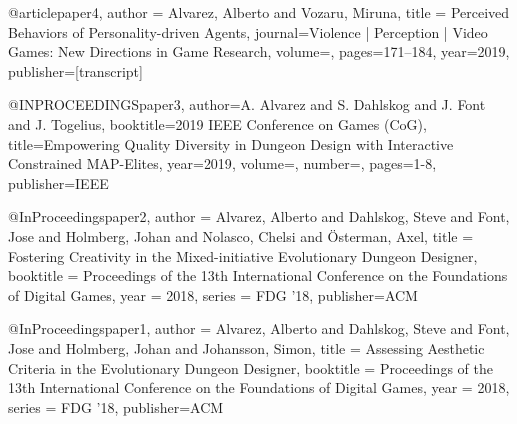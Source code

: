 @article{paper4,
  author    = {Alvarez, Alberto and Vozaru, Miruna},
  title     = {Perceived Behaviors of Personality-driven Agents},
  journal={Violence | Perception | Video Games: New Directions in Game Research},
  volume={},
  pages={171--184},
  year={2019},
  publisher={[transcript]}
}

@INPROCEEDINGS{paper3,
author={A. {Alvarez} and S. {Dahlskog} and J. {Font} and J. {Togelius}},
booktitle={2019 IEEE Conference on Games (CoG)},
title={Empowering Quality Diversity in Dungeon Design with Interactive Constrained MAP-Elites},
year={2019},
volume={},
number={},
pages={1-8},
publisher={IEEE}
}

@InProceedings{paper2,
  author    = {Alvarez, Alberto and Dahlskog, Steve and Font, Jose and Holmberg, Johan and Nolasco, Chelsi and \"{O}sterman, Axel},
  title     = {Fostering Creativity in the Mixed-initiative Evolutionary Dungeon Designer},
  booktitle = {Proceedings of the 13th International Conference on the Foundations of Digital Games},
  year      = {2018},
  series    = {FDG '18},
  publisher={ACM}
}

@InProceedings{paper1,
  author    = {Alvarez, Alberto and Dahlskog, Steve and Font, Jose and Holmberg, Johan and Johansson, Simon},
  title     = {Assessing Aesthetic Criteria in the Evolutionary Dungeon Designer},
  booktitle = {Proceedings of the 13th International Conference on the Foundations of Digital Games},
  year      = {2018},
  series    = {FDG '18},
  publisher={ACM}
}